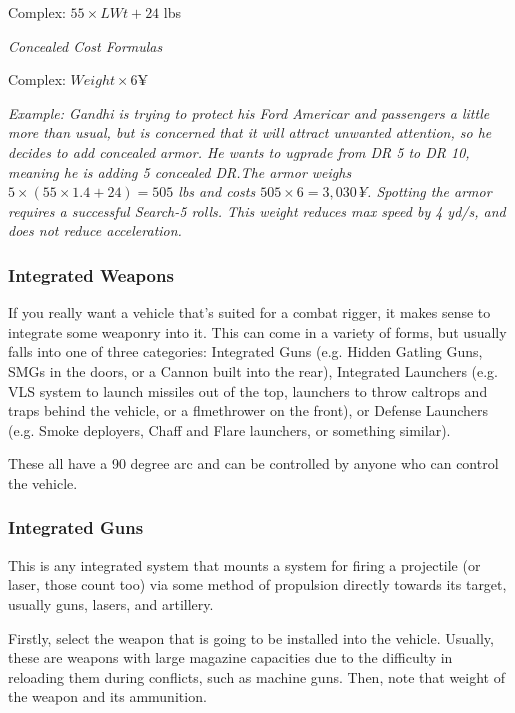 \begin{multicols*}{2}
{\begin{minipage}[t]{0.43\textwidth}
			Complex: $55 \times LWt + 24$ lbs
			
			\textit{Concealed Cost Formulas}
			
			Complex: $Weight \times 6$¥
	\end{minipage}}
	
	\textcolor{OliveGreen}{\textit{Example: Gandhi is trying to protect his Ford Americar and passengers a little more than usual, but is concerned that it will attract unwanted attention, so he decides to add concealed armor. He wants to ugprade from DR 5 to DR 10, meaning he is adding 5 concealed DR.\newline The armor weighs $5 \times (55 \times 1.4 + 24) = 505$ lbs and costs $505 \times 6 = 3,030$¥. Spotting the armor requires a successful Search-5 rolls. This weight reduces max speed by 4 yd/s, and does not reduce acceleration.}}
	
	\subsubsection{Integrated Weapons}
	
	If you really want a vehicle that's suited for a combat rigger, it makes sense to integrate some weaponry into it. This can come in a variety of forms, but usually falls into one of three categories: Integrated Guns (e.g. Hidden Gatling Guns, SMGs in the doors, or a Cannon built into the rear), Integrated Launchers (e.g. VLS system to launch missiles out of the top, launchers to throw caltrops and traps behind the vehicle, or a flmethrower on the front), or Defense Launchers (e.g. Smoke deployers, Chaff and Flare launchers, or something similar).
	
	These all have a 90 degree arc and can be controlled by anyone who can control the vehicle.
	
	\subsubsection{Integrated Guns}
	
	This is any integrated system that mounts a system for firing a projectile (or laser, those count too) via some method of propulsion directly towards its target, usually guns, lasers, and artillery.
	
	Firstly, select the weapon that is going to be installed into the vehicle. Usually, these are weapons with large magazine capacities due to the difficulty in reloading them during conflicts, such as machine guns. Then, note that weight of the weapon and its ammunition.
	

\end{multicols*}
